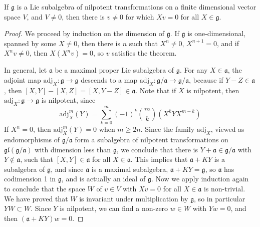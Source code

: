 \begin{lemma}
    If $\mathfrak{g}$ is a Lie subalgebra of nilpotent transformations on a finite dimensional vector space $V$, and $V \neq 0$, then there is $v \neq 0$ for which $Xv = 0$ for all $X \in \mathfrak{g}$.
\end{lemma}
\begin{proof}
    We proceed by induction on the dimension of $\mathfrak{g}$. If $\mathfrak{g}$ is one-dimensional, spanned by some $X \neq 0$, then there is $n$ such that $X^n \neq 0$, $X^{n+1} = 0$, and if $X^n v \neq 0$, then $X(X^n v) = 0$, so $v$ satisfies the theorem.

    In general, let $\mathfrak{a}$ be a maximal proper Lie subalgebra of $\mathfrak{g}$. For any $X \in \mathfrak{a}$, the adjoint map $\text{adj}_X: \mathfrak{g} \to \mathfrak{g}$ descends to a map $\text{adj}_X: \mathfrak{g}/\mathfrak{a} \to \mathfrak{g}/\mathfrak{a}$, because if $Y - Z \in \mathfrak{a}$, then $[X,Y] - [X,Z] = [X,Y-Z] \in \mathfrak{a}$. Note that if $X$ is nilpotent, then $\text{adj}_X: \mathfrak{g} \to \mathfrak{g}$ is nilpotent, since
    \[ \text{adj}^m_X(Y) = \sum_{k = 0}^m (-1)^k {m \choose k} (X^kYX^{m-k}) \]
    If $X^n = 0$, then $\text{adj}^m_X(Y) = 0$ when $m \geq 2n$. Since the family $\text{adj}_X$, viewed as endomorphisms of $\mathfrak{g}/\mathfrak{a}$ form a subalgebra of nilpotent transformations on $\mathfrak{gl}(\mathfrak{g}/\mathfrak{a})$ with dimension less than $\mathfrak{g}$, we conclude that there is $Y + \mathfrak{a} \in \mathfrak{g}/\mathfrak{a}$ with $Y \not \in \mathfrak{a}$, such that $[X,Y] \in \mathfrak{a}$ for all $X \in \mathfrak{a}$. This implies that $\mathfrak{a} + KY$ is a subalgebra of $\mathfrak{g}$, and since $\mathfrak{a}$ is a maximal subalgebra, $\mathfrak{a} + KY = \mathfrak{g}$, so $\mathfrak{a}$ has codimension 1 in $\mathfrak{g}$, and is actually an ideal of $\mathfrak{g}$. Now we apply induction again to conclude that the space $W$ of $v \in V$ with $Xv = 0$ for all $X \in \mathfrak{a}$ is non-trivial. We have proved that $W$ is invariant under multiplication by $\mathfrak{g}$, so in particular $YW \subset W$. Since $Y$ is nilpotent, we can find a non-zero $w \in W$ with $Yw = 0$, and then $(\mathfrak{a} + KY)w = 0$.
\end{proof}

